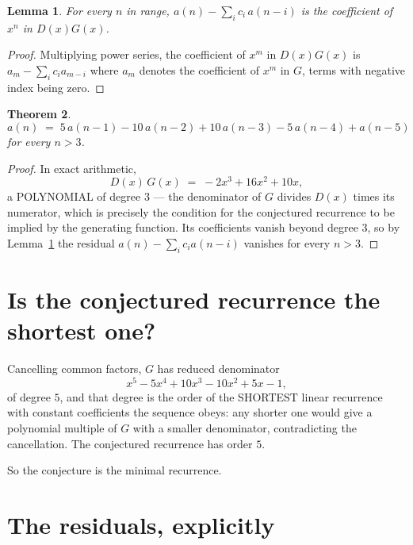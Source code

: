 \documentclass[11pt,a4paper]{article}
\theoremstyle{plain}
\newtheorem{theorem}{Theorem}
\newtheorem{lemma}[theorem]{Lemma}
\theoremstyle{definition}
\begin{document}
\begin{lemma}\label{lem:key}
For every $n$ in range, $a(n)-\sum_i c_i\,a(n-i)$ is the coefficient of $x^{n}$ in
$D(x)G(x)$.
\end{lemma}

\begin{proof}
Multiplying power series, the coefficient of $x^{m}$ in $D(x)G(x)$ is
$a_m-\sum_i c_i a_{m-i}$ where $a_m$ denotes the coefficient of $x^{m}$ in $G$, terms with
negative index being zero.
\end{proof}

\begin{theorem}
\[
a(n)\;=\;5\,a(n-1) - 10\,a(n-2) + 10\,a(n-3) - 5\,a(n-4) + a(n-5)
\]
for every $n>3$.
\end{theorem}

\begin{proof}
In exact arithmetic,
\[
D(x)\,G(x)\;=\;- 2 x^{3} + 16 x^{2} + 10 x,
\]
a POLYNOMIAL of degree $3$ --- the denominator of $G$ divides $D(x)$ times its numerator,
which is precisely the condition for the conjectured recurrence to be implied by the
generating function. Its coefficients vanish beyond degree $3$, so by
Lemma~\ref{lem:key} the residual $a(n)-\sum_ic_ia(n-i)$ vanishes for every
$n>3$.
\end{proof}

\section{Is the conjectured recurrence the shortest one?}

Cancelling common factors, $G$ has reduced denominator
\[
x^{5} - 5 x^{4} + 10 x^{3} - 10 x^{2} + 5 x - 1,
\]
of degree $5$, and that degree is the order of the SHORTEST linear recurrence with
constant coefficients the sequence obeys: any shorter one would give a polynomial multiple of
$G$ with a smaller denominator, contradicting the cancellation. The conjectured recurrence has
order $5$.

So the conjecture is the minimal recurrence.

\section{The residuals, explicitly}
\end{document}
